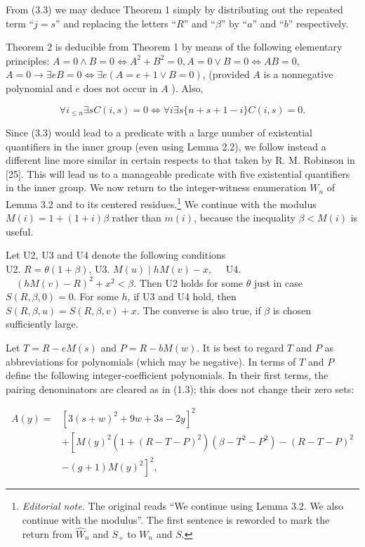 \documentclass[11pt,a4paper]{article}
\newcommand{\ednote}[1]{\footnote{\textit{Editorial note.} #1}}
\newcommand{\WW}{\widehat W}
\begin{document}
From (3.3) we may deduce Theorem 1 simply by distributing out the repeated term ``$j=s$'' and replacing the letters ``$R$'' and ``$\beta$'' by ``$a$'' and ``$b$'' respectively.

Theorem 2 is deducible from Theorem 1 by means of the following elementary principles: $A=0 \wedge B=0 \Leftrightarrow A^{2}+B^{2}=0, A=0 \vee B=0 \Leftrightarrow AB=0$, $A=0 \rightarrow \exists e B=0 \Leftrightarrow \exists e(A=e+1 \vee B=0)$, (provided $A$ is a nonnegative polynomial and $e$ does not occur in $A$ ). Also,

$$
\forall i_{\leq n} \exists s C(i, s)=0 \Leftrightarrow \forall i \exists s\{n+s+1-i\} C(i, s)=0 .
$$

Since (3.3) would lead to a predicate with a large number of existential quantifiers in the inner group (even using Lemma 2.2), we follow instead a different line more similar in certain respects to that taken by R. M. Robinson in [25]. This will lead us to a manageable predicate with five existential quantifiers in the inner group. We now return to the integer-witness enumeration $W_n$ of Lemma 3.2 and to its centered residues.\ednote{The original reads ``We continue using Lemma 3.2. We also continue with the modulus''. The first sentence is reworded to mark the return from $\WW_n$ and $S_+$ to $W_n$ and $S$.} We continue with the modulus $M(i)=1+(1+i) \beta$ rather than $m(i)$, because the inequality $\beta<M(i)$ is useful.

Let U2, U3 and U4 denote the following conditions\\
U2. $R=\theta(1+\beta)$, U3. $M(u) \mid h M(v)-x, \quad$ U4. $\quad(h M(v)-R)^{2}+x^{2}<\beta$. Then U2 holds for some $\theta$ just in case $S(R, \beta, 0)=0$. For some $h$, if U3 and U4 hold, then $S(R, \beta, u)=S(R, \beta, v)+x$. The converse is also true, if $\beta$ is chosen sufficiently large.

Let $T=R-e M(s)$ and $P=R-b M(w)$. It is best to regard $T$ and $P$ as abbreviations for polynomials (which may be negative). In terms of $T$ and $P$ define the following integer-coefficient polynomials. In their first terms, the pairing denominators are cleared as in (1.3); this does not change their zero sets:

$$
\begin{aligned}
A(y)= & {[3(s+w)^2+9w+3s-2y]^2} \\
& +\left[M(y)^{2}\left(1+(R-T-P)^{2}\right)\left(\beta-T^{2}-P^{2}\right)-(R-T-P)^{2}\right. \\
& \left.-(g+1) M(y)^{2}\right]^{2},
\end{aligned}
$$
\end{document}
